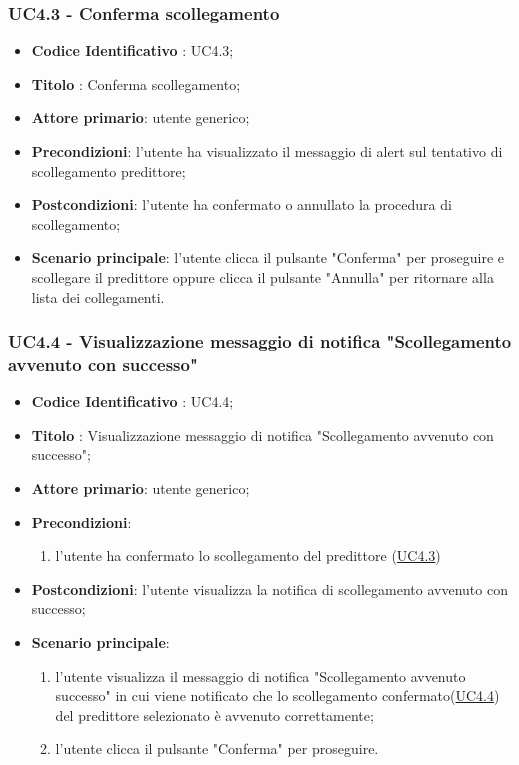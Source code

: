 	\subsubsection{UC4.3 - Conferma scollegamento}
		\begin{itemize}
			\item\textbf{Codice Identificativo} : UC4.3;
			\item\textbf{Titolo} : Conferma scollegamento;
			\item\textbf{Attore primario}: utente generico;
			\item\textbf{Precondizioni}: l'utente ha visualizzato il messaggio di alert sul tentativo di scollegamento predittore;
			\item\textbf{Postcondizioni}: l'utente ha confermato o annullato la procedura di scollegamento;	
			\item\textbf{Scenario principale}: l'utente clicca il pulsante "Conferma" per proseguire e scollegare il predittore oppure clicca il pulsante "Annulla" per ritornare alla lista dei collegamenti.
			\end{itemize}
			
	\label{par:UC4.4}
	\subsubsection{UC4.4 - Visualizzazione messaggio di notifica "Scollegamento avvenuto con successo"}
		\begin{itemize}
			\item\textbf{Codice Identificativo} : UC4.4;
			\item\textbf{Titolo} : Visualizzazione messaggio di notifica "Scollegamento avvenuto con successo";
			\item\textbf{Attore primario}: utente generico;
			\item\textbf{Precondizioni}: 
				\begin{enumerate}
					\item l'utente ha confermato lo scollegamento del predittore (\hyperref[par:UC4.3]{UC4.3})
				\end{enumerate}
			\item\textbf{Postcondizioni}: l'utente visualizza la notifica di scollegamento avvenuto con successo;					
			\item\textbf{Scenario principale}:
				\begin{enumerate}
					\item l'utente visualizza il messaggio di notifica "Scollegamento avvenuto successo" in cui viene notificato che lo scollegamento confermato(\hyperref[par:UC4.4]{UC4.4}) del predittore selezionato è avvenuto correttamente;
					\item l'utente clicca il pulsante "Conferma" per proseguire.		
				\end{enumerate}		
		\end{itemize}
			

